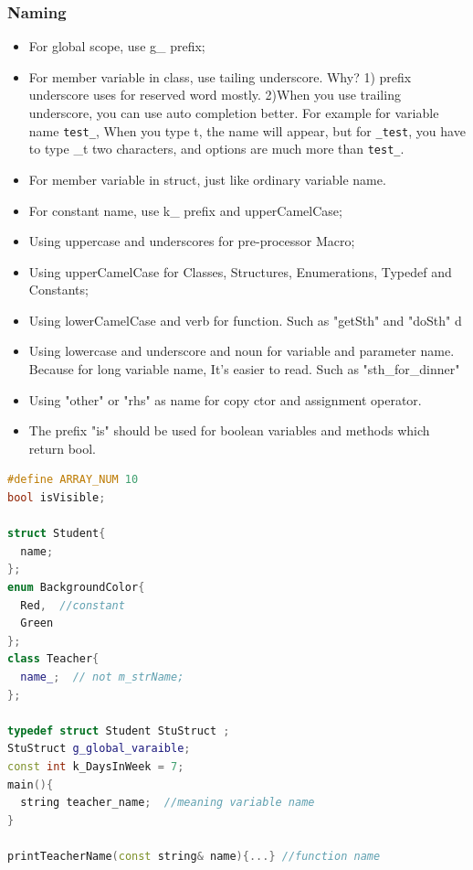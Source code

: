 \documentclass[a4paper,12pt,twoside]{book}
\begin{document}
\subsubsection{Naming}
\begin{itemize}

\item For global scope, use g\_ prefix; 

\item For member variable in class, use tailing underscore. Why? 1) prefix underscore uses for reserved word mostly. 2)When you use trailing underscore, you can use auto completion better. For example for variable name \texttt{test\_}, When you type t, the name will appear, but for \texttt{\_test}, you have to type \_t two characters, and options are much more than \texttt{test\_}.

\item For member variable in struct, just like ordinary variable name. 

\item For constant name, use k\_ prefix and upperCamelCase;

\item Using uppercase and underscores for pre-processor Macro;

\item Using upperCamelCase for Classes, Structures, Enumerations, Typedef and  Constants;

\item Using lowerCamelCase and verb for function. Such as "getSth" and "doSth"
d
\item Using lowercase and underscore  and noun for variable and parameter name. Because for long variable name, It's easier to read. Such as "sth\_for\_dinner"

\item Using "other" or "rhs" as name for copy ctor and assignment operator.

\item The prefix "is" should be used for boolean variables and methods which return bool.

\end{itemize}

\begin{lstlisting}[frame=single, language=c++]
#define ARRAY_NUM 10
bool isVisible;

struct Student{
  name;
};
enum BackgroundColor{
  Red,  //constant
  Green
};
class Teacher{
  name_;  // not m_strName;  
};

typedef struct Student StuStruct ;
StuStruct g_global_varaible;
const int k_DaysInWeek = 7;
main(){
  string teacher_name;  //meaning variable name
}

printTeacherName(const string& name){...} //function name
\end{lstlisting}
\end{document}
